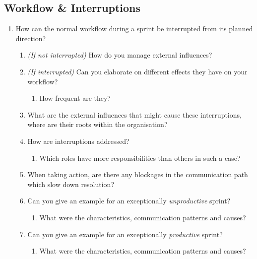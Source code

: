 \subsection*{Workflow \& Interruptions}

\begin{enumerate}
  \item How can the normal workflow during a sprint be interrupted from its planned direction?
  
  \begin{enumerate}
     \item \emph{(If not interrupted)} How do you manage external influences?
     \item \emph{(If interrupted)} Can you elaborate on different effects they have on your workflow?
     
        \begin{enumerate}
         \item How frequent are they?
         \end{enumerate}
        
     \item What are the external influences that might cause these interruptions, where are their roots within the organisation?
     \item How are interruptions addressed?
     
        \begin{enumerate}
            \item Which roles have more responsibilities than others in such a case?
         \end{enumerate}
     
     \item When taking action, are there any blockages in the communication path which slow down resolution?
     \item Can you give an example for an exceptionally \emph{unproductive} sprint?
     
        \begin{enumerate}
            \item What were the characteristics, communication patterns and causes?
         \end{enumerate}
        
     \item Can you give an example for an exceptionally \emph{productive} sprint?
     
        \begin{enumerate}
            \item What were the characteristics, communication patterns and causes?
         \end{enumerate}
        

\end{enumerate}
\end{enumerate}
